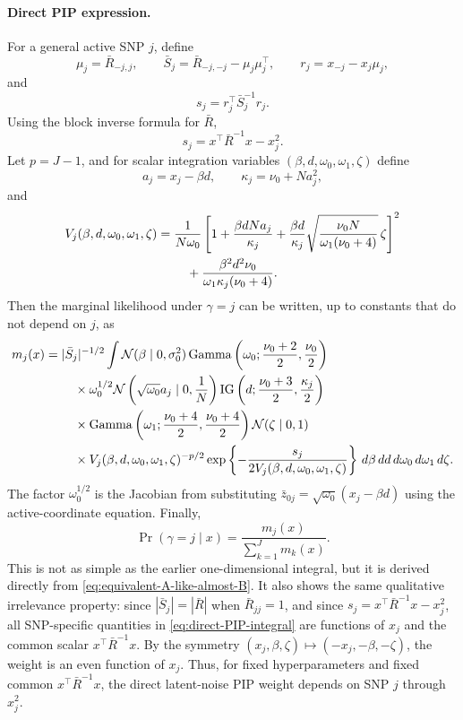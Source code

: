 \documentclass[11pt]{article}
\newcommand{\IG}{\operatorname{IG}}
\newcommand{\Gam}{\operatorname{Gamma}}
\newcommand{\Normal}{\mathcal N}
\begin{document}
\paragraph{Direct PIP expression.}
For a general active SNP $j$, define
\[
\mu_j=\bar R_{-j,j},
\qquad
\bar S_j=\bar R_{-j,-j}-\mu_j\mu_j^\top,
\qquad
r_j=x_{-j}-x_j\mu_j,
\]
and
\[
s_j=r_j^\top\bar S_j^{-1}r_j.
\]
Using the block inverse formula for $\bar R$,
\[
s_j=x^\top\bar R^{-1}x-x_j^2.
\]
Let $p=J-1$, and for scalar integration variables
$(\beta,d,\omega_0,\omega_1,\zeta)$ define
\[
a_j=x_j-\beta d,
\qquad
\kappa_j=\nu_0+Na_j^2,
\]
and
\begin{align}
V_j(\beta,d,\omega_0,\omega_1,\zeta)
=\;&
\frac{1}{N\omega_0}
\left[
1+\frac{\beta dNa_j}{\kappa_j}
+\frac{\beta d}{\kappa_j}
\sqrt{\frac{\nu_0 N}{\omega_1(\nu_0+4)}}\,\zeta
\right]^2
\notag\\
&\quad+
\frac{\beta^2d^2\nu_0}
{\omega_1\kappa_j(\nu_0+4)}.
\label{eq:direct-Vj}
\end{align}
Then the marginal likelihood under $\gamma=j$ can be written, up to constants
that do not depend on $j$, as
\begin{align}
m_j(x)
=\;&
|\bar S_j|^{-1/2}
\int
\Normal(\beta\mid 0,\sigma_0^2)
\Gam\left(\omega_0;\frac{\nu_0+2}{2},\frac{\nu_0}{2}\right)
\notag\\
&\quad\times
\omega_0^{1/2}
\Normal\left(\sqrt{\omega_0}a_j\mid 0,\frac1N\right)
\IG\left(d;\frac{\nu_0+3}{2},\frac{\kappa_j}{2}\right)
\notag\\
&\quad\times
\Gam\left(\omega_1;\frac{\nu_0+4}{2},\frac{\nu_0+4}{2}\right)
\Normal(\zeta\mid0,1)
\notag\\
&\quad\times
V_j(\beta,d,\omega_0,\omega_1,\zeta)^{-p/2}
\exp\left\{-\frac{s_j}{2V_j(\beta,d,\omega_0,\omega_1,\zeta)}\right\}
\,
d\beta\,dd\,d\omega_0\,d\omega_1\,d\zeta .
\label{eq:direct-PIP-integral}
\end{align}
The factor $\omega_0^{1/2}$ is the Jacobian from substituting
$\bar z_{0j}=\sqrt{\omega_0}(x_j-\beta d)$ using the active-coordinate
equation. Finally,
\begin{equation}\label{eq:direct-PIP}
\boxed{
\Pr(\gamma=j\mid x)
=
\frac{m_j(x)}{\sum_{k=1}^J m_k(x)}.
}
\end{equation}
This is not as simple as the earlier one-dimensional integral, but it is
derived directly from \eqref{eq:equivalent-A-like-almost-B}. It also shows the
same qualitative irrelevance property: since $|\bar S_j|=|\bar R|$ when
$\bar R_{jj}=1$, and since $s_j=x^\top\bar R^{-1}x-x_j^2$, all SNP-specific
quantities in \eqref{eq:direct-PIP-integral} are functions of $x_j$ and the
common scalar $x^\top\bar R^{-1}x$. By the symmetry
$(x_j,\beta,\zeta)\mapsto(-x_j,-\beta,-\zeta)$, the weight is an even function
of $x_j$. Thus, for fixed hyperparameters and fixed common $x^\top\bar R^{-1}x$,
the direct latent-noise PIP weight depends on SNP $j$ through $x_j^2$.
\end{document}

